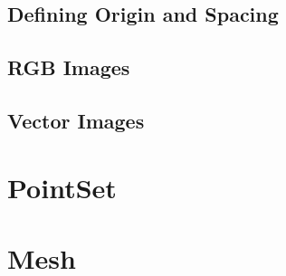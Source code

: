 \subsection{Defining Origin and Spacing}
\label{sec:DefiningImageOriginAndSpacing}
%
%



\subsection{RGB Images}
\label{sec:DefiningRGBImages}
%
%



\subsection{Vector Images}
\label{sec:DefiningVectorImages}
%
%




\section{PointSet}\label{PointSetSection}




\section{Mesh}\label{MeshSection}


